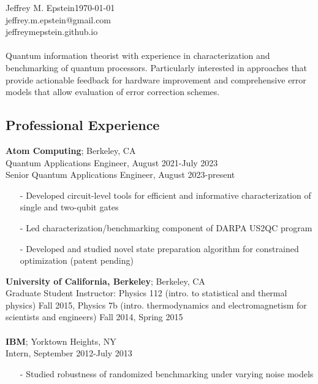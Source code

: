 \documentclass[]{article}
\begin{document}
\noindent \large Jeffrey M. Epstein\vspace{5pt}\hfill\small \today\\
jeffrey.m.epstein@gmail.com\\
jeffreymepstein.github.io\\
\\
Quantum information theorist with experience in characterization and benchmarking of quantum processors. Particularly interested in approaches that provide actionable feedback for hardware improvement and comprehensive error models that allow evaluation of error correction schemes.


\subsection*{Professional Experience}
\textbf{Atom Computing}; Berkeley, CA\\
Quantum Applications Engineer, August 2021-July 2023\\
Senior Quantum Applications Engineer, August 2023-present
\begin{itemize}
\item[-] Developed circuit-level tools for efficient and informative characterization of single and two-qubit gates
\item[-] Led characterization/benchmarking component of DARPA US2QC program
\item[-] Developed and studied novel state preparation algorithm for constrained optimization (patent pending)
\end{itemize}
\vspace{6pt}
\noindent\textbf{University of California, Berkeley}; Berkeley, CA\\
Graduate Student Instructor: Physics 112 (intro. to statistical and thermal physics) Fall 2015, Physics 7b (intro. thermodynamics and electromagnetism for scientists and engineers) Fall 2014, Spring 2015\\
\\
\noindent\textbf{IBM}; Yorktown Heights, NY\\
Intern, September 2012-July 2013
\begin{itemize}
\item[-] Studied robustness of randomized benchmarking under varying noise models
\end{itemize}
\end{document}
